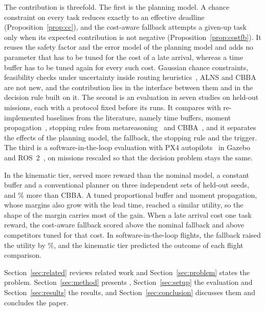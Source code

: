 The contribution is threefold. The first is the planning model. A chance constraint on every task reduces exactly to an
effective deadline (Proposition~\ref{prop:cc}), and the cost-aware fallback attempts a given-up task only when its
expected contribution is not negative (Proposition~\ref{prop:costfb}). It reuses the safety factor and the error model
of the planning model and adds no parameter that has to be tuned for the cost of a late arrival, whereas a time buffer
has to be tuned again for every such cost. Gaussian chance
constraints, feasibility checks under uncertainty inside routing
heuristics~\cite{ehmke2015ensuring,bomboi2022stochastic}, ALNS and CBBA are not new, and the contribution lies in the
interface between them and in the decision rule built on it. The second is an evaluation in seven studies on held-out missions, each with a protocol fixed before
its runs. It compares \mname{} with re-implemented baselines from the literature, namely time buffers, moment
propagation~\cite{ehmke2015ensuring}, stopping rules from
metareasoning~\cite{boddy1994deliberation,zilberstein1996using,svegliato2018meta} and CBBA~\cite{choi2009consensus}, and
it separates the effects of the planning model, the fallback, the stopping rule and the trigger. The third is a
software-in-the-loop evaluation with PX4 autopilots~\cite{meier2015px4} in Gazebo~\cite{koenig2004gazebo} and
ROS~2~\cite{macenski2022ros2}, on missions rescaled so that the decision problem stays the same.

In the kinematic tier, \mname{} served more reward than the nominal model, a constant buffer and a conventional planner
on three independent sets of held-out seeds, and \% more than CBBA. A tuned proportional buffer and
moment propagation, whose margins also grow with the lead time, reached a similar utility, so the shape of the margin
carries most of the gain. When a late arrival cost one task reward, the cost-aware fallback scored above the nominal
fallback and above competitors tuned for that cost. In software-in-the-loop flights, the fallback raised the utility by
\%, and the kinematic tier predicted the outcome of each flight comparison.

Section~\ref{sec:related} reviews related work and Section~\ref{sec:problem} states the problem.
Section~\ref{sec:method} presents \mname{}, Section~\ref{sec:setup} the evaluation and Section~\ref{sec:results} the
results, and Section~\ref{sec:conclusion} discusses them and concludes the paper.
